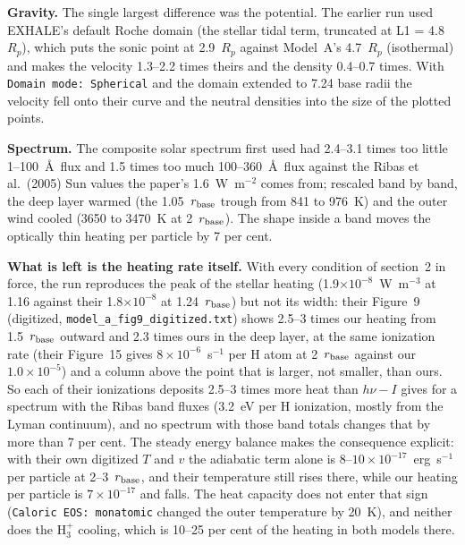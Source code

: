 \documentclass[english,a4paper]{my_memo}
\begin{document}
\textbf{Gravity.} The single largest difference was the potential. The
earlier run used EXHALE's default Roche domain (the stellar tidal term,
truncated at L1 = 4.8~$R_p$), which puts the sonic point at 2.9~$R_p$
against Model~A's 4.7~$R_p$ (isothermal) and makes the velocity 1.3--2.2
times theirs and the density 0.4--0.7 times. With \texttt{Domain mode:
Spherical} and the domain extended to 7.24 base radii the velocity fell onto
their curve and the neutral densities into the size of the plotted points.

\textbf{Spectrum.} The composite solar spectrum first used had 2.4--3.1
times too little 1--100~\AA\ flux and 1.5 times too much 100--360~\AA\ flux
against the Ribas et al.\ (2005) Sun values the paper's 1.6~W~m$^{-2}$ comes
from; rescaled band by band, the deep layer warmed (the 1.05~$r_{\rm base}$
trough from 841 to 976~K) and the outer wind cooled (3650 to 3470~K at
2~$r_{\rm base}$). The shape inside a band moves the optically thin heating
per particle by 7 per cent.

\textbf{What is left is the heating rate itself.} With every condition of
section~2 in force, the run reproduces the peak of the stellar heating
(1.9$\times10^{-8}$~W~m$^{-3}$ at 1.16 against their 1.8$\times10^{-8}$ at
1.24~$r_{\rm base}$) but not its width: their Figure~9 (digitized,
\texttt{model\_a\_fig9\_digitized.txt}) shows 2.5--3 times our heating from
1.5~$r_{\rm base}$ outward and 2.3 times ours in the deep layer, at the
same ionization rate (their Figure~15 gives $8\times10^{-6}$~s$^{-1}$ per H
atom at 2~$r_{\rm base}$ against our $1.0\times10^{-5}$) and a column above
the point that is larger, not smaller, than ours. So each of their
ionizations deposits 2.5--3 times more heat than $h\nu - I$ gives for a
spectrum with the Ribas band fluxes (3.2~eV per H ionization, mostly from
the Lyman continuum), and no spectrum with those band totals changes that
by more than 7 per cent. The steady energy balance makes the consequence
explicit: with their own digitized $T$ and $v$ the adiabatic term alone is
$8$--$10\times10^{-17}$~erg~s$^{-1}$ per particle at 2--3~$r_{\rm base}$,
and their temperature still rises there, while our heating per particle is
$7\times10^{-17}$ and falls. The heat capacity does not enter that sign
(\texttt{Caloric EOS: monatomic} changed the outer temperature by 20~K), and
neither does the H$_3^+$ cooling, which is 10--25 per cent of the heating in
both models there.
\end{document}
